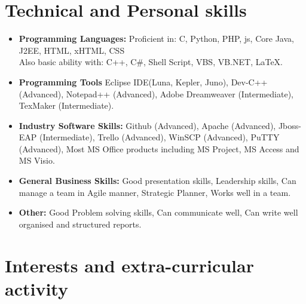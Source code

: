 \documentclass[11pt,a4paper,sans]{moderncv}        %
\begin{document}
\section{Technical and Personal skills}

\vspace{8pt}

\begin{itemize}

\item \textbf{Programming Languages:} Proficient in: C, Python, PHP, js, Core Java, J2EE, HTML, xHTML, CSS \\ Also basic ability with: C++, C\#, Shell Script, VBS, VB.NET, LaTeX.

\vspace{8pt}

\item \textbf{Programming Tools} Eclipse IDE(Luna, Kepler, Juno), Dev-C++ (Advanced), Notepad++ (Advanced), Adobe Dreamweaver (Intermediate),  TexMaker (Intermediate).

\vspace{8pt}

\item \textbf{Industry Software Skills:} Github (Advanced), Apache (Advanced), Jboss-EAP (Intermediate), Trello (Advanced), WinSCP (Advanced), PuTTY (Advanced), Most MS Office products including MS Project, MS Access and MS Visio.

\vspace{8pt}

\item \textbf{General Business Skills:} Good presentation skills, Leadership skills, Can manage a team in Agile manner, Strategic Planner, Works well in a team.

\vspace{8pt}

\item \textbf{Other:} Good Problem solving skills, Can communicate well, Can write well organised and structured reports.

\end{itemize}

\section{Interests and extra-curricular activity}

\vspace{8pt}
\end{document}
